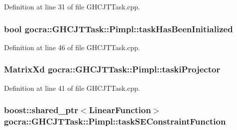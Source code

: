 Definition at line 31 of file G\+H\+C\+J\+T\+Task.\+cpp.

\subsubsection[{\texorpdfstring{task\+Has\+Been\+Initialized}{taskHasBeenInitialized}}]{\setlength{\rightskip}{0pt plus 5cm}bool gocra\+::\+G\+H\+C\+J\+T\+Task\+::\+Pimpl\+::task\+Has\+Been\+Initialized}\hypertarget{structgocra_1_1GHCJTTask_1_1Pimpl_ad07475df136dd26fc89634fa6dd9a9b7}{}\label{structgocra_1_1GHCJTTask_1_1Pimpl_ad07475df136dd26fc89634fa6dd9a9b7}


Definition at line 46 of file G\+H\+C\+J\+T\+Task.\+cpp.

\subsubsection[{\texorpdfstring{taski\+Projector}{taskiProjector}}]{\setlength{\rightskip}{0pt plus 5cm}Matrix\+Xd gocra\+::\+G\+H\+C\+J\+T\+Task\+::\+Pimpl\+::taski\+Projector}\hypertarget{structgocra_1_1GHCJTTask_1_1Pimpl_a0ae67b26b52f69987d41bc3232636ccb}{}\label{structgocra_1_1GHCJTTask_1_1Pimpl_a0ae67b26b52f69987d41bc3232636ccb}


Definition at line 41 of file G\+H\+C\+J\+T\+Task.\+cpp.

\subsubsection[{\texorpdfstring{task\+S\+E\+Constraint\+Function}{taskSEConstraintFunction}}]{\setlength{\rightskip}{0pt plus 5cm}boost\+::shared\+\_\+ptr$<${\bf Linear\+Function}$>$ gocra\+::\+G\+H\+C\+J\+T\+Task\+::\+Pimpl\+::task\+S\+E\+Constraint\+Function}\hypertarget{structgocra_1_1GHCJTTask_1_1Pimpl_ab1b71cfa2f203377834f529d2c0e98c3}{}\label{structgocra_1_1GHCJTTask_1_1Pimpl_ab1b71cfa2f203377834f529d2c0e98c3}


